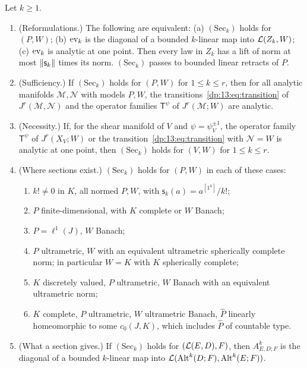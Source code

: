 \begin{theorem}\label{dp:thm:analytic-jets}
Let $k\ge1$.
\begin{enumerate}
\item \textup{(Reformulations.)} The following are equivalent: \textup{(a)} $(\mathrm{Sec}_k)$ holds for $(P,W)$; \textup{(b)} $\operatorname{ev}_k$ is the diagonal of a bounded $k$-linear map into $\mathcal L(Z_k,W)$; \textup{(c)} $\operatorname{ev}_k$ is analytic at one point. Then every law in $Z_k$ has a lift of norm at most $\lVert \mathsf s_k\rVert$ times its norm. $(\mathrm{Sec}_k)$ passes to bounded linear retracts of $P$.
\item \textup{(Sufficiency.)} If $(\mathrm{Sec}_k)$ holds for $(P,W)$ for $1\le k\le r$, then for all analytic manifolds $\mathcal M,\mathcal N$ with models $P,W$, the transitions~\eqref{dp:13:eq:transition} of $J^r(\mathcal M,\mathcal N)$ and the operator families $\mathsf T^\psi$ of $J^r(\mathcal M;W)$ are analytic.
\item \textup{(Necessity.)} If, for the shear manifold of $V$ and $\psi=\psi_V^{\pm1}$, the operator family $\mathsf T^\psi$ of $J^r(X_V;W)$ or the transition~\eqref{dp:13:eq:transition} with $\mathcal N=W$ is analytic at one point, then $(\mathrm{Sec}_k)$ holds for $(V,W)$ for $1\le k\le r$.
\item \textup{(Where sections exist.)} $(\mathrm{Sec}_k)$ holds for $(P,W)$ in each of these cases:
\begin{enumerate}
\item $k!\ne0$ in $K$, all normed $P,W$, with $\mathsf s_k(a)=a^{[1^k]}/k!$;
\item $P$ finite-dimensional, with $K$ complete or $W$ Banach;
\item $P=\ell^1(J)$, $W$ Banach;
\item $P$ ultrametric, $W$ with an equivalent ultrametric spherically complete norm; in particular $W=K$ with $K$ spherically complete;
\item $K$ discretely valued, $P$ ultrametric, $W$ Banach with an equivalent ultrametric norm;
\item $K$ complete, $P$ ultrametric, $W$ ultrametric Banach, $\widehat P$ linearly homeomorphic to some $c_0(J,K)$, which includes $\widehat P$ of countable type.
\end{enumerate}
\item \textup{(What a section gives.)} If $(\mathrm{Sec}_k)$ holds for $(\mathcal L(E,D),F)$, then $A^k_{E,D;F}$ is the diagonal of a bounded $k$-linear map into $\mathcal L(\operatorname{Alt}^k(D;F),\operatorname{Alt}^k(E;F))$.

\end{enumerate}
\end{theorem}
